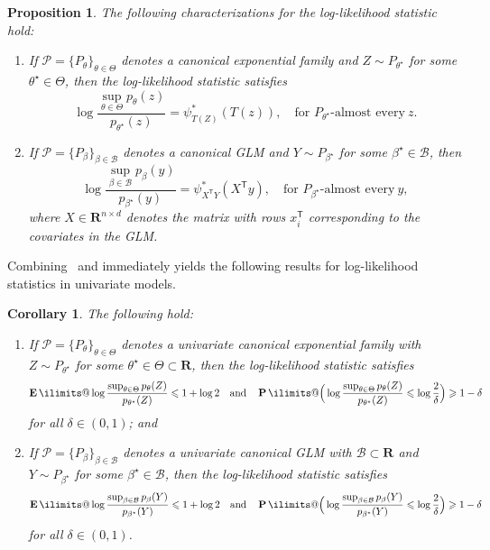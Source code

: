 \documentclass[11pt, letterpaper, hidelinks]{article}
\makeatletter
\newcommand{\R}{\mathbf R}
\newcommand{\cB}{\mathcal{B}}
\newcommand{\cP}{\mathcal{P}}
\newcommand{\1}{\mathbf 1}
\renewcommand{\leq}{\leqslant}
\renewcommand{\geq}{\geqslant}
\newcommand{\T}{\mathsf{T}}
\newcommand{\E}{\operatorname*{\mathbf{E}}\ilimits@}
\renewcommand{\P}{\operatorname*{\mathbf{P}}\ilimits@}
\theoremstyle{plain}
\newtheorem{proposition}{Proposition}[section]
\newtheorem{corollary}{Corollary}[section]
\theoremstyle{definition}
\newcommand{\thetastar}{\theta^\star}
\newcommand{\betastar}{\beta^\star}
\makeatother
\begin{document}
\begin{proposition}
\label{prop:variational-characterization-of-log-likelihood-stat}
The following characterizations for the log-likelihood statistic hold: 
\begin{enumerate}[label=(\roman*)]
\item 
\label{item:var-char-log-stat-exp-family}
If $\cP = \{P_\theta\}_{\theta \in \Theta}$ denotes a canonical exponential family and $Z \sim P_{\thetastar}$ for some $\thetastar \in \Theta$, then the log-likelihood statistic satisfies
\[
\log \frac{\sup_{\theta \in \Theta} p_\theta(z)}{p_{\thetastar}(z)} = \psi_{T(Z)}^\ast(T(z)), \quad \mbox{for $P_{\thetastar}$-almost every}~z.
\] 
\item 
\label{item:var-char-log-stat-GLM}
If $\cP = \{P_\beta\}_{\beta \in \cB}$ denotes a canonical GLM and $Y \sim P_{\betastar}$ for some $\betastar\in\cB$, then
\[
\log \frac{\sup_{\beta \in \cB} p_{\beta}(y)}{p_{\betastar}(y)} = \psi^\ast_{X^\T Y}(X^\T y), \quad \mbox{for $P_{\betastar}$-almost every}~y,
\]
where $X \in \R^{n \times d}$ denotes the matrix with rows $x_i^\T$ corresponding to the covariates in the GLM.
\end{enumerate}
\end{proposition}

Combining~ and  immediately yields the following results for log-likelihood statistics in univariate models. 

\begin{corollary}
\label{cor:dimone}
The following hold: 
\begin{enumerate}[label=(\roman*)]
\item If $\cP = \{P_\theta\}_{\theta \in \Theta}$ denotes a univariate canonical exponential family with $Z \sim P_{\thetastar}$ for some $\thetastar \in \Theta \subset \R$, then the log-likelihood statistic satisfies
\[
\E \log \frac{\sup_{\theta \in \Theta} p_\theta(Z)}{p_{\thetastar}(Z)} \leq 1 + \log 2 \quad \mbox{and} \quad \P\Big(\log \frac{\sup_{\theta \in \Theta} p_\theta(Z)}{p_{\thetastar}(Z)} \leq \log \frac{2}{\delta}\Big) \geq 1 - \delta 
\] 
for all $\delta \in (0, 1)$; and 
\item If $\cP = \{P_\beta\}_{\beta \in \cB}$ denotes a univariate canonical GLM with $\cB\subset\R$ and $Y \sim P_{\betastar}$ for some $\betastar \in \cB$, then the log-likelihood statistic satisfies
\[
\E \log \frac{\sup_{\beta \in \cB} p_{\beta}(Y)}{p_{\betastar}(Y)} \leq 1 + \log 2 \quad \mbox{and} \quad \P\Big(\log \frac{\sup_{\beta \in \cB} p_{\beta}(Y)}{p_{\betastar}(Y)} \leq \log \frac{2}{\delta}\Big) \geq 1 - \delta 
\] 
for all $\delta \in (0, 1)$.
\end{enumerate}
\end{corollary}
\end{document}
